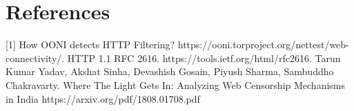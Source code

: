 \documentclass[12pt]{article}
\begin{document}
\newpage
\section{References}
[1] How OONI detects HTTP Filtering? https://ooni.torproject.org/nettest/web-connectivity/.
\newline
[2] HTTP 1.1 RFC 2616. https://tools.ietf.org/html/rfc2616.
\newline
[3] Tarun Kumar Yadav, Akshat Sinha, Devashish Gosain, Piyush Sharma, Sambuddho Chakravarty.
\newline
\noindent Where The Light Gets In: Analyzing Web Censorship Mechanisms in India
\newline
https://arxiv.org/pdf/1808.01708.pdf
%
\end{document}
